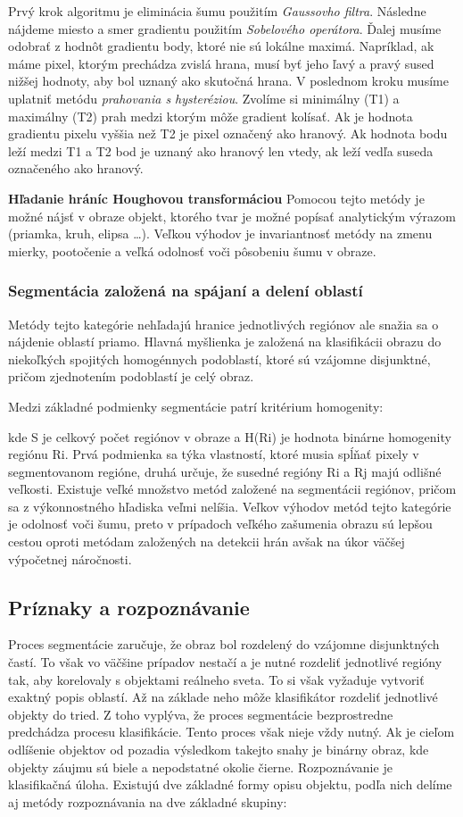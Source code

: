 Prvý krok algoritmu je eliminácia šumu použitím \textit{Gaussovho filtra}.  Následne nájdeme miesto a smer gradientu použitím \textit{Sobelového operátora}. Ďalej musíme odobrať z hodnôt gradientu  body, ktoré nie sú lokálne maximá. Napríklad, ak máme pixel, ktorým prechádza zvislá hrana, musí byť jeho ľavý a pravý sused nižšej hodnoty, aby bol uznaný  ako skutočná hrana. V poslednom kroku musíme uplatniť metódu \textit{prahovania s hysteréziou}. Zvolíme si minimálny (T1) a maximálny (T2) prah medzi ktorým môže gradient kolísať.  Ak je hodnota gradientu pixelu vyššia než T2 je pixel označený ako hranový. Ak hodnota bodu leží medzi T1 a T2 bod je uznaný ako hranový len vtedy, ak leží vedľa suseda označeného ako hranový.


\textbf{Hľadanie hráníc Houghovou transformáciou}
Pomocou tejto metódy je možné nájsť v obraze objekt, ktorého tvar je možné popísať analytickým výrazom (priamka, kruh, elipsa …). Veľkou výhodov je invariantnosť metódy na zmenu mierky, pootočenie a veľká odolnosť voči pôsobeniu šumu v obraze. 

\subsubsection{Segmentácia založená na spájaní a delení oblastí}
Metódy tejto kategórie nehľadajú hranice jednotlivých regiónov ale snažia sa o nájdenie oblastí priamo. Hlavná myšlienka je založená na klasifikácii obrazu do niekoľkých spojitých homogénnych podoblastí,  ktoré sú vzájomne disjunktné, pričom zjednotením podoblastí je celý obraz.


Medzi základné podmienky segmentácie patrí kritérium homogenity:


kde S je celkový počet regiónov v obraze a H(Ri) je hodnota binárne homogenity regiónu Ri. Prvá podmienka sa týka vlastností, ktoré musia spĺňať pixely v segmentovanom regióne, druhá určuje, že susedné regióny Ri a Rj majú odlišné veľkosti. Existuje veľké množstvo metód založené na segmentácii regiónov, pričom sa z výkonnostného hľadiska veľmi nelíšia. Veľkov výhodov metód tejto kategórie je odolnosť voči šumu, preto v prípadoch veľkého zašumenia obrazu sú lepšou cestou oproti metódam založených na detekcii hrán avšak na úkor väčšej výpočetnej  náročnosti.  

\subsection{Príznaky a rozpoznávanie}
Proces segmentácie zaručuje, že obraz bol rozdelený do vzájomne disjunktných častí. To však vo väčšine prípadov nestačí a je nutné rozdeliť jednotlivé regióny tak, aby korelovaly s objektami reálneho sveta. To si však vyžaduje vytvoriť exaktný popis oblastí. Až na základe neho môže klasifikátor rozdeliť jednotlivé objekty do tried.  Z toho vyplýva, že proces segmentácie bezprostredne predchádza procesu klasifikácie.  Tento proces však nieje vždy nutný. Ak je cieľom odlíšenie objektov od pozadia výsledkom takejto snahy je binárny obraz, kde objekty záujmu sú biele a nepodstatné okolie čierne.
Rozpoznávanie je klasifikačná úloha. Existujú dve základné formy opisu objektu, podľa nich delíme aj metódy rozpoznávania na dve základné skupiny: 

